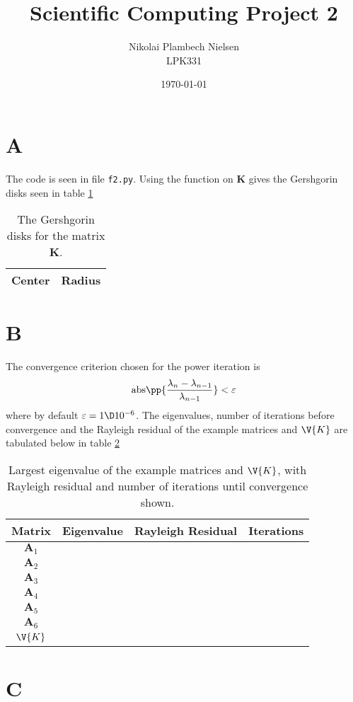 \documentclass[a4paper,10pt]{article}
\title{Scientific Computing Project 2}
\author{Nikolai Plambech Nielsen\\LPK331}
\date{\today}
\begin{document}
	\maketitle
	\section*{A}
	The code is seen in file \texttt{f2.py}. Using the function on $ \textbf{K} $ gives the Gershgorin disks seen in table \ref{tab:disks}
	\begin{table}[H]
		\centering
		\begin{tabular}{c|c}
			Center & Radius \\
			\hline
			
		\end{tabular}
	\caption{The Gershgorin disks for the matrix $ \textbf{K} $.}
	\label{tab:disks}
	\end{table}
	
	\section*{B}
	The convergence criterion chosen for the power iteration is
	\begin{equation}\label{key}
		\text{abs}\pp{\frac{\lambda_{n} - \lambda_{n-1}}{\lambda_{n-1}}} < \varepsilon
	\end{equation}
	where by default $ \varepsilon = 1\D 10^{-6} $. The eigenvalues, number of iterations before convergence and the Rayleigh residual of the example matrices and $ \V{K} $ are tabulated below in table \ref{tab:power_iter}
	\begin{table}[H]
		\centering
		\begin{tabular}{c|c|c|c}
			Matrix & Eigenvalue & Rayleigh Residual & Iterations \\
			\hline
			$ \textbf{A}_1 $ & & & \\
			$ \textbf{A}_2 $ & & & \\
			$ \textbf{A}_3 $ & & & \\
			$ \textbf{A}_4 $ & & & \\
			$ \textbf{A}_5 $ & & & \\
			$ \textbf{A}_6 $ & & & \\
			$ \V{K} $ & & &
		\end{tabular}
		\caption{Largest eigenvalue of the example matrices and $ \V{K} $, with Rayleigh residual and number of iterations until convergence shown.}
		\label{tab:power_iter}
	\end{table}
	
	\section*{C}
	
	
	
\end{document}
